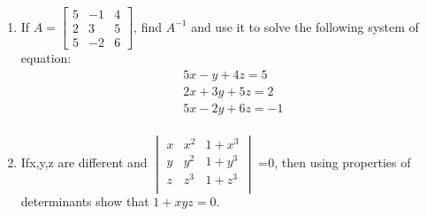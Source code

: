 \documentclass[12pt,-letter paper]{article}
\begin{document}
\begin{enumerate}
	\item If \(A= \begin{bmatrix} 5 & -1 & 4\\ 2 & 3 & 5\\  5 & -2 & 6 \end{bmatrix}\), find $A^{-1}$ and use it to solve the following system of 
		\\equation: \\
		\begin{align}
			5x-y+4z=5\\
			2x+3y+5z=2\\
			5x-2y+6z=-1\\
		\end{align}
	\item Ifx,y,z are different and $\begin{vmatrix} x & x^{2} & 1+x^{3}\\

			y & y^{2} & 1+y^{3}\\
			z & z^{3} & 1+z^{3}\\
	\end{vmatrix}$
			=$0$, then using properties of determinants show that $1+xyz=0$.



\end{enumerate}
\end{document}
